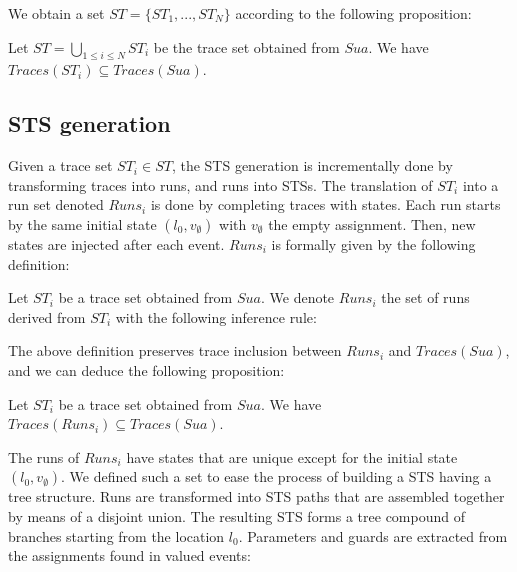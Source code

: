 We obtain a set $ST=\{ST_1,...,ST_N\}$ according to the following
proposition:

\begin{proposition}
Let $ST=\bigcup_{1 \leq i \leq N} ST_i$ be the trace set
obtained from $Sua$. We have $Traces(ST_i) \subseteq Traces(Sua)$.
\end{proposition}

\subsection{STS generation}

Given a trace set $ST_i\in ST$, the STS generation is
incrementally done by transforming traces into runs, and runs
into STSs. The translation of $ST_i$ into a run set denoted
$Runs_i$ is done by completing traces with states. Each run
starts by the same initial state $(l_0,v_\emptyset)$ with
$v_\emptyset$ the empty assignment. Then, new states are injected
after each event. $Runs_i$ is formally given by the following
definition:

\begin{definition}
	Let $ST_i$ be a trace set obtained from $Sua$. We denote
	$Runs_i$ the set of runs derived from $ST_i$ with the
	following inference rule:
    \begin{center}
	\end{center}

\end{definition}

The above definition preserves trace inclusion between $Runs_i$
and $Traces(Sua)$, and we can deduce the following proposition:

\begin{proposition}
Let $ST_i$ be a trace set obtained from $Sua$. We have $Traces(Runs_i) \subseteq Traces(Sua)$.
\end{proposition}

The runs of $Runs_i$ have states that are unique except for the
initial state $(l_0,v_\emptyset)$. We defined such a set to
ease the process of building a STS having a tree structure.  Runs
are transformed into STS paths that are assembled together by
means of a disjoint union. The resulting STS forms a tree
compound of branches starting from the location $l_0$. Parameters
and guards are extracted from the assignments found in valued
events:

